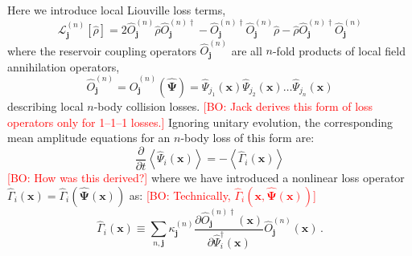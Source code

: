 \documentclass[aps,prl,twocolumn,showpacs,amsmath,amssymb,superscriptaddress]{revtex4-1}
\newcommand{\bogdansremark}[1]{\textcolor{red}{{[}BO: #1{]}}}
\newcommand{\xvec}{\boldsymbol{x}}
\newcommand{\jvec}{\boldsymbol{j}}
\newcommand{\Psivec}{\boldsymbol{\Psi}}
\begin{document}
Here we introduce local Liouville loss terms,
\begin{equation}
	\mathcal{L}_{\jvec}^{(n)} \left[ \hat{\rho}\right] =
	2 \hat{O}_{\jvec}^{(n)} \hat{\rho}\hat{O}_{\jvec}^{(n)\dagger} -
	\hat{O}_{\jvec}^{(n)\dagger}\hat{O}_{\jvec}^{(n)}\hat{\rho} -
	\hat{\rho}\hat{O}_{\jvec}^{(n)\dagger}\hat{O}_{\jvec}^{(n)}
\end{equation}
where the reservoir coupling operators $\hat{O}_{\jvec}^{(n)}$
are all $n$-fold products of local field annihilation operators,
\begin{equation}
	\hat{O}_{\jvec}^{(n)} =
	\hat{O}_{\jvec}^{(n)} \left( \widehat{\Psivec} \right) =
	\widehat{\Psi}_{j_{1}} \left( \xvec \right)
	\widehat{\Psi}_{j_{2}} \left( \xvec \right) \ldots
	\widehat{\Psi}_{j_{n}} \left( \xvec \right)
\end{equation}
describing local $n$-body collision losses.
	\bogdansremark{Jack derives this form of loss operators only for 1--1--1 losses.}
Ignoring unitary evolution, the corresponding mean amplitude equations
for an $n$-body loss of this form are:
\begin{equation}
	\frac{\partial}{\partial t} \left\langle
		\widehat{\Psi}_{i} \left( \xvec \right)
	\right\rangle =
	-\left\langle \hat{\Gamma}_{i} \left( \xvec \right) \right\rangle
\end{equation}
	\bogdansremark{How was this derived?}
where we have introduced a nonlinear loss operator $\hat{\Gamma}_{i} \left( \xvec \right) =
\hat{\Gamma}_{i} \left( \widehat{\Psivec} \left( \xvec \right) \right)$ as:
	\bogdansremark{Technically, $\hat{\Gamma}_{i} \left( \xvec,
	\widehat{\Psivec} \left( \xvec \right) \right)$}
\begin{equation}
	\hat{\Gamma}_{i} \left( \xvec \right) \equiv
	\sum_{n,\jvec} \kappa_{\jvec}^{(n)}
	\frac{\partial\hat{O}_{\jvec}^{(n)\dagger}	\left( \xvec \right)}
		{\partial \hat{\Psi}_{i}^{\dagger} \left( \xvec \right)}
	\hat{O}_{\jvec}^{(n)} \left( \xvec \right) \,.
\end{equation}
\end{document}
